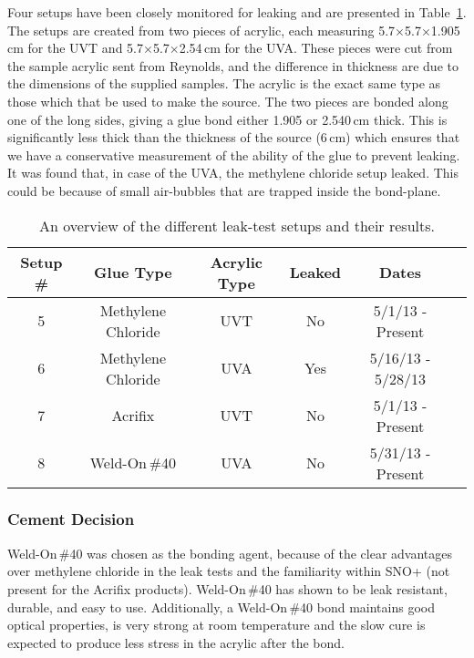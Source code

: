 Four setups have been closely monitored for leaking and are presented in Table~\ref{tb:glues}. The setups are created from two pieces of acrylic, each measuring 5.7$\times$5.7$\times$1.905\,cm for the UVT and 5.7$\times$5.7$\times$2.54\,cm for the UVA. These pieces were cut from the sample acrylic sent from Reynolds, and the difference in thickness are due to the dimensions of the supplied samples. The acrylic is the exact same type as those which that be used to make the source. The two pieces are bonded along one of the long sides, giving a glue bond either 1.905 or 2.540\,cm thick. This is significantly less thick than the thickness of the source (6\,cm) which ensures that we have a conservative measurement of the ability of the glue to prevent leaking.  It was found that, in case of the UVA, the methylene chloride setup leaked. This could be because of small air-bubbles that are trapped inside the bond-plane. 
\begin{table}
  \begin{center} %
    \begin{tabular}{ | c | c | c | c | c | c  |} 
        \hline 
Setup \# & Glue Type & Acrylic Type & Leaked & Dates \\ \hline 
5 & Methylene Chloride  & UVT & No & 5/1/13 - Present  \\ 
6 & Methylene Chloride  & UVA & Yes & 5/16/13 - 5/28/13  \\ 
7 & Acrifix   & UVT &  No & 5/1/13 - Present  \\ 
8 & Weld-On\,\#40 & UVA & No & 5/31/13 - Present  \\ 

    \hline
    \end{tabular}
    \end{center}
        \caption{An overview of the different leak-test setups and their results.}
    \label{tb:glues} 
\end{table}

\subsubsection{Cement Decision}
Weld-On\,\#40 was chosen as the bonding agent, because of the clear advantages over methylene chloride in the leak tests and the familiarity within SNO+ (not present for the Acrifix products). Weld-On\,\#40 has shown to be leak resistant, durable, and easy to use. Additionally, a Weld-On\,\#40 bond maintains good optical properties, is very strong at room temperature and the slow cure is expected to produce less stress in the acrylic after the bond.
